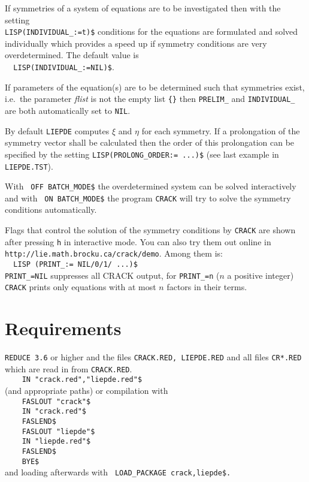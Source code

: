 \documentclass[12pt]{article}
\begin{document}
If symmetries of a system of equations are to be investigated 
then with the setting \\
\verb+LISP(INDIVIDUAL_:=t)$+ conditions for the equations are formulated 
and solved individually which provides a speed up if symmetry conditions are
very overdetermined. The default value is \\ 
\verb+  LISP(INDIVIDUAL_:=NIL)$+. 

If parameters of the equation(s) are to be determined such that
symmetries exist, i.e.\ the parameter {\it flist} is not the empty
list \verb+{}+ then {\tt PRELIM\_} and {\tt INDIVIDUAL\_} are both
automatically set to {\tt NIL}.

By default {\tt LIEPDE} computes $\xi$ and $\eta$ for each
symmetry. If a prolongation of the symmetry vector shall be calculated
then the order of this prolongation can be specified by the setting 
\verb+LISP(PROLONG_ORDER:= ...)$+ (see last example in {\tt LIEPDE.TST}). 

With \verb+ OFF BATCH_MODE$+ the overdetermined system can be solved
interactively and with 
\verb+ ON BATCH_MODE$+ the program {\tt CRACK} will try to solve the
symmetry conditions automatically.

Flags that control the solution of the symmetry conditions by {\tt CRACK}
are shown after pressing {\tt h} in interactive mode. You can also 
try them out online in \\ \verb+http://lie.math.brocku.ca/crack/demo+.
Among them is: \\
\verb+  LISP (PRINT_:= NIL/0/1/ ...)$+ \\
\verb+PRINT_=NIL+ suppresses all CRACK output, for \verb+PRINT_=n+ 
($n$ a positive integer) 
{\tt CRACK} prints only equations with at most $n$ factors in their terms.


\section{Requirements}

{\tt REDUCE 3.6} or higher and 
the files {\tt CRACK.RED, LIEPDE.RED} and 
all files {\tt CR*.RED} which are read in from {\tt CRACK.RED}. \\
\verb+    IN "crack.red","liepde.red"$+ \\
(and appropriate paths) or compilation with \\
\verb+    FASLOUT "crack"$+ \\
\verb+    IN "crack.red"$+ \\
\verb+    FASLEND$+ \\
\verb+    FASLOUT "liepde"$+ \\
\verb+    IN "liepde.red"$+ \\
\verb+    FASLEND$+ \\
\verb+    BYE$+ \\
and loading afterwards with \verb+ LOAD_PACKAGE crack,liepde$.+
\end{document}
